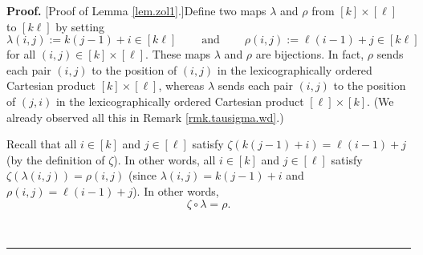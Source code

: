 \documentclass[numbers=enddot,12pt,final,onecolumn,notitlepage]{scrartcl}%
\theoremstyle{definition}
\newenvironment{proof}[1][Proof]{\noindent\textbf{#1.} }{\ \rule{0.5em}{0.5em}}
\begin{document}
\begin{proof}
[Proof of Lemma \ref{lem.zol1}.]Define two maps $\lambda$ and $\rho$ from
$\left[  k\right]  \times\left[  \ell\right]  $ to $\left[  k\ell\right]  $ by
setting%
\[
\lambda\left(  i,j\right)  :=k\left(  j-1\right)  +i\in\left[  k\ell\right]
\ \ \ \ \ \ \ \ \ \ \text{and}\ \ \ \ \ \ \ \ \ \ \rho\left(  i,j\right)
:=\ell\left(  i-1\right)  +j\in\left[  k\ell\right]
\]
for all $\left(  i,j\right)  \in\left[  k\right]  \times\left[  \ell\right]
$. These maps $\lambda$ and $\rho$ are bijections. In fact, $\rho$ sends each
pair $\left(  i,j\right)  $ to the position of $\left(  i,j\right)  $ in the
lexicographically ordered Cartesian product $\left[  k\right]  \times\left[
\ell\right]  $, whereas $\lambda$ sends each pair $\left(  i,j\right)  $ to
the position of $\left(  j,i\right)  $ in the lexicographically ordered
Cartesian product $\left[  \ell\right]  \times\left[  k\right]  $. (We already
observed all this in Remark \ref{rmk.tausigma.wd}.)

Recall that all $i\in\left[  k\right]  $ and $j\in\left[  \ell\right]  $
satisfy $\zeta\left(  k\left(  j-1\right)  +i\right)  =\ell\left(  i-1\right)
+j$ (by the definition of $\zeta$). In other words, all $i\in\left[  k\right]
$ and $j\in\left[  \ell\right]  $ satisfy $\zeta\left(  \lambda\left(
i,j\right)  \right)  =\rho\left(  i,j\right)  $ (since $\lambda\left(
i,j\right)  =k\left(  j-1\right)  +i$ and $\rho\left(  i,j\right)
=\ell\left(  i-1\right)  +j$). In other words,
\begin{equation}
\zeta\circ\lambda=\rho. \label{pf.lem.zol1.zl=r}%
\end{equation}



\end{proof}
\end{document}
